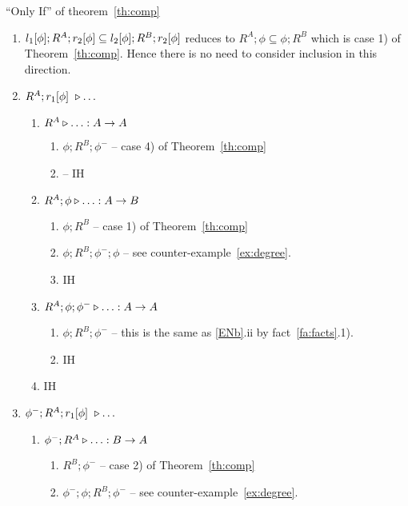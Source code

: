 \documentclass[10pt]{article}
\begin{document}
\newpage
\begin{Proof} 
``{\sc Only If}'' of theorem~\ref{th:comp}
\begin{enumerate}\MyLPar
\item 
$l_1[\phi];R^A;r_2[\phi] \subseteq l_2[\phi];R^B;r_2[\phi]$ reduces to 
$R^A;\phi \subseteq \phi;R^B$ which is case 1) of
Theorem~\ref{th:comp}. Hence there is no need to consider
inclusion in this direction.
\item 
$R^A;r_1[\phi]\ \triangleright\ldots$
  \begin{enumerate}\MyLPar
   \item $R^A \triangleright\ldots : A\rightarrow A$
    \begin{enumerate}\MyLPar
     \item $\phi;R^B;\phi^-$ -- case 4) of Theorem~\ref{th:comp}
     \item -- IH
    \end{enumerate}
   \item\label{ENb} $R^A;\phi \triangleright\ldots : A\rightarrow B$
    \begin{enumerate}\MyLPar
     \item $\phi;R^B$ -- case 1) of Theorem~\ref{th:comp}
     \item $\phi;R^B;\phi^-;\phi$ -- see counter-example~\ref{ex:degree}.
     \item IH
    \end{enumerate}
   \item $R^A;\phi;\phi^-\triangleright\ldots : A\rightarrow A$
    \begin{enumerate}\MyLPar
     \item $\phi;R^B;\phi^-$ -- this is the same as \ref{ENb}.ii 
           by fact~\ref{fa:facts}.1).
     \item IH
    \end{enumerate}
   \item IH
  \end{enumerate}
\item $\phi^-;R^A;\Ra\ \almost\ldots$ 
  \begin{enumerate}\MyLPar
   \item\label{aa} $\phi^-;R^A \triangleright\ldots : B\rightarrow A$
    \begin{enumerate}\MyLPar
      \item $R^B;\phi^-$ -- case 2) of Theorem~\ref{th:comp}
      \item $\phi^-;\phi;R^B;\phi^-$ -- see counter-example~\ref{ex:degree}. 

\end{enumerate}
\end{enumerate}
\end{enumerate}
\end{Proof}
\end{document}
